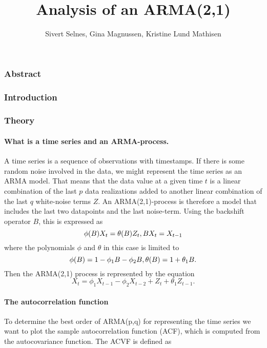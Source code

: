 \documentclass[]{article}
\title{Analysis of an ARMA(2,1)}
\author{Sivert Selnes, Gina Magnussen, Kristine Lund Mathisen}
\date{\begin{enumerate}
\def\labelenumi{\arabic{enumi}.}
\setcounter{enumi}{22}
\tightlist
\item
  september 2018
\end{enumerate}}
\let\oldparagraph\paragraph
\renewcommand{\paragraph}[1]{\oldparagraph{#1}\mbox{}}
\begin{document}
\maketitle

{
\setcounter{tocdepth}{3}
\tableofcontents
}
\subsubsection{Abstract}\label{abstract}

\subsubsection{Introduction}\label{introduction}

\subsubsection{Theory}\label{theory}

\paragraph{What is a time series and an
ARMA-process.}\label{what-is-a-time-series-and-an-arma-process.}

A time series is a sequence of observations with timestamps. If there is
some random noise involved in the data, we might represent the time
series as an ARMA model. That means that the data value at a given time
\(t\) is a linear combination of the last \(p\) data realizations added
to another linear combination of the last \(q\) white-noise terms \(Z\).
An ARMA(2,1)-process is therefore a model that includes the last two
datapoints and the last noise-term. Using the backshift operator \(B\),
this is expressed as \[
 \phi(B)X_t =\theta(B)Z_t, \\
 BX_t = X_{t-1}
 \] where the polynomials \(\phi\) and \(\theta\) in this case is
limited to \[
 \phi(B) = 1-\phi_1B - \phi_2B, \\
 \theta(B) = 1+\theta_1B. \\
 \] Then the ARMA(2,1) process is represented by the equation \[
 X_t =\phi_1X_{t-1} - \phi_2X_{t-2} + Z_t + \theta_1Z_{t-1}.
 \]

\paragraph{The autocorrelation
function}\label{the-autocorrelation-function}

To determine the best order of ARMA(p,q) for representing the time
series we want to plot the sample autocorrelation function (ACF), which
is computed from the autocovariance function. The ACVF is defined as
\end{document}
